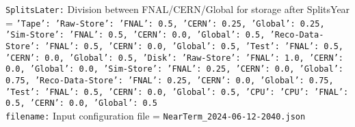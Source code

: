 {\tt SplitsLater:} Division between FNAL/CERN/Global for storage after SplitsYear = {\tt {'Tape': {'Raw-Store': {'FNAL': 0.5, 'CERN': 0.25, 'Global': 0.25}, 'Sim-Store': {'FNAL': 0.5, 'CERN': 0.0, 'Global': 0.5}, 'Reco-Data-Store': {'FNAL': 0.5, 'CERN': 0.0, 'Global': 0.5}, 'Test': {'FNAL': 0.5, 'CERN': 0.0, 'Global': 0.5}}, 'Disk': {'Raw-Store': {'FNAL': 1.0, 'CERN': 0.0, 'Global': 0.0}, 'Sim-Store': {'FNAL': 0.25, 'CERN': 0.0, 'Global': 0.75}, 'Reco-Data-Store': {'FNAL': 0.25, 'CERN': 0.0, 'Global': 0.75}, 'Test': {'FNAL': 0.5, 'CERN': 0.0, 'Global': 0.5}}, 'CPU': {'CPU': {'FNAL': 0.5, 'CERN': 0.0, 'Global': 0.5}}}} \\
{\tt filename:} Input configuration file = {\tt NearTerm\_2024-06-12-2040.json} \\
